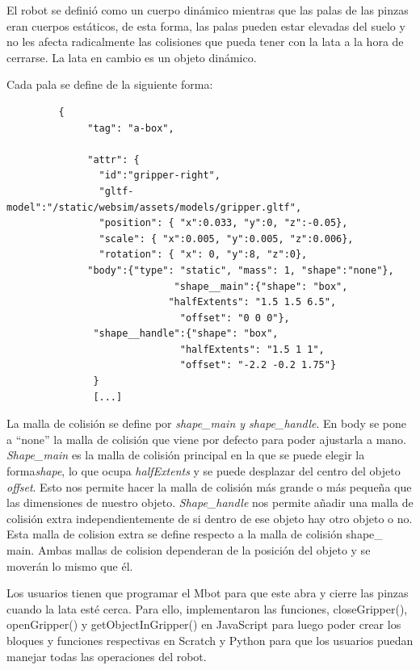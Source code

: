 El robot se definió como un cuerpo dinámico mientras que las palas de las pinzas eran cuerpos estáticos, de esta forma, las palas pueden estar elevadas del suelo y no les afecta  radicalmente las colisiones que pueda tener con la lata a la hora de cerrarse.  La lata en cambio es un objeto dinámico.

Cada pala se define de la siguiente forma: 

\begin{lstlisting}         
         {
              "tag": "a-box",

              "attr": {
                "id":"gripper-right",
		        "gltf-model":"/static/websim/assets/models/gripper.gltf",
                "position": { "x":0.033, "y":0, "z":-0.05},
                "scale": { "x":0.005, "y":0.005, "z":0.006},
                "rotation": { "x": 0, "y":8, "z":0},
 			  "body":{"type": "static", "mass": 1, "shape":"none"},
                             "shape__main":{"shape": "box",
			                "halfExtents": "1.5 1.5 6.5",
                              "offset": "0 0 0"},
		       "shape__handle":{"shape": "box",
                              "halfExtents": "1.5 1 1",
                              "offset": "-2.2 -0.2 1.75"}
               }
               [...]
\end{lstlisting}


La malla de colisión se define por \textit{shape\_main y shape\_handle}. En body se pone a ``none'' la malla de colisión que viene por defecto para poder ajustarla a mano.
\textit{Shape\_main} es la malla de colisión principal en la que se puede elegir la forma\textit{shape}, lo que ocupa \textit{halfExtents} y se puede desplazar del centro del objeto \textit{offset}. Esto nos permite hacer la malla de colisión más grande o más pequeña que las dimensiones de nuestro objeto. \textit{ Shape\_handle} nos permite añadir una malla de colisión extra independientemente de si dentro de ese  objeto hay otro objeto o no. Esta malla de colision extra se define respecto a la malla de colisión shape\_ main. Ambas mallas de colision dependeran de la posición del objeto y se moverán lo mismo que él.

Los usuarios tienen que programar el Mbot para que este abra y cierre las pinzas cuando la lata esté cerca. Para ello, implementaron las funciones, closeGripper(), openGripper() y getObjectInGripper() en JavaScript para luego poder crear los bloques y funciones respectivas en Scratch y Python para que los usuarios puedan manejar todas las operaciones del robot. 
 
